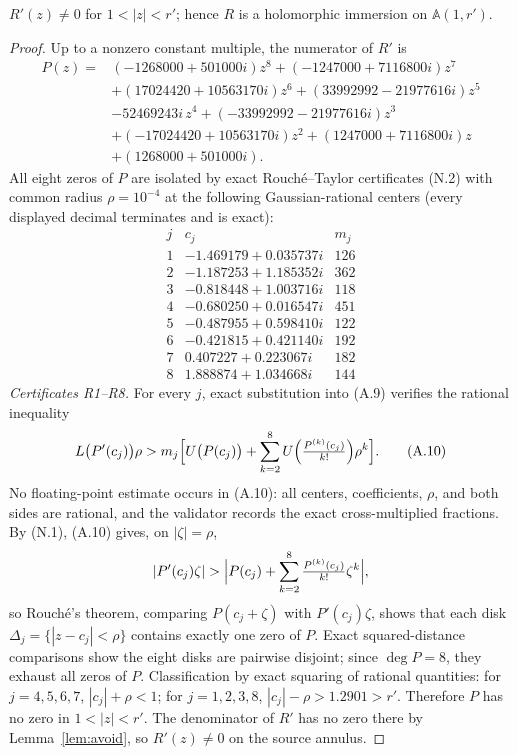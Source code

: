 \begin{lemma}\label{lem:immersion}
\(R'(z)\ne0\) for \(1<|z|<r'\); hence \(R\) is a holomorphic immersion on \(\mathbb A(1,r')\).
\end{lemma}

\begin{proof}
Up to a nonzero constant multiple, the numerator of \(R'\) is
\[\begin{aligned} P(z)={}&(-1268000+501000i)z^{8}+(-1247000+7116800i)z^{7}\\ &+(17024420+10563170i)z^{6}+(33992992-21977616i)z^{5}\\ &-52469243i\,z^{4}+(-33992992-21977616i)z^{3}\\ &+(-17024420+10563170i)z^{2}+(1247000+7116800i)z\\ &+(1268000+501000i). \end{aligned}\tag{A.9}\]
All eight zeros of \(P\) are isolated by exact Rouch\'e--Taylor certificates (N.2) with common radius \(\rho=10^{-4}\) at the following Gaussian-rational centers (every displayed decimal terminates and is exact):
\[\begin{array}{r|l|r}
j & c_j & m_j\\\hline
1 & -1.469179+0.035737i & 126\\
2 & -1.187253+1.185352i & 362\\
3 & -0.818448+1.003716i & 118\\
4 & -0.680250+0.016547i & 451\\
5 & -0.487955+0.598410i & 122\\
6 & -0.421815+0.421140i & 192\\
7 & 0.407227+0.223067i & 182\\
8 & 1.888874+1.034668i & 144
\end{array}\]
\emph{Certificates R1--R8.} For every \(j\), exact substitution into (A.9) verifies the rational inequality
\[ L\bigl(P'(c_j)\bigr)\rho>m_j\Bigl[U\bigl(P(c_j)\bigr)+\sum_{k=2}^{8}U\Bigl(\tfrac{P^{(k)}(c_j)}{k!}\Bigr)\rho^{k}\Bigr]. \tag{A.10} \]
No floating-point estimate occurs in (A.10): all centers, coefficients, \(\rho\), and both sides are rational, and the validator records the exact cross-multiplied fractions. By (N.1), (A.10) gives, on \(|\zeta|=\rho\),
\[ |P'(c_j)\zeta|>\Bigl|P(c_j)+\sum_{k=2}^{8}\tfrac{P^{(k)}(c_j)}{k!}\zeta^{k}\Bigr|, \]
so Rouch\'e's theorem, comparing \(P(c_j+\zeta)\) with \(P'(c_j)\zeta\), shows that each disk \(\Delta_j=\{|z-c_j|<\rho\}\) contains exactly one zero of \(P\). Exact squared-distance comparisons show the eight disks are pairwise disjoint; since \(\deg P=8\), they exhaust all zeros of \(P\).
Classification by exact squaring of rational quantities: for \(j=4,5,6,7\), \(|c_j|+\rho<1\); for \(j=1,2,3,8\), \(|c_j|-\rho>1.2901>r'\). Therefore \(P\) has no zero in \(1<|z|<r'\). The denominator of \(R'\) has no zero there by Lemma~\ref{lem:avoid}, so \(R'(z)\ne0\) on the source annulus.
\end{proof}